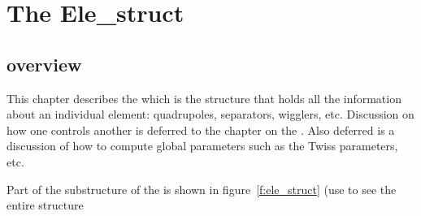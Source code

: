 \chapter{The Ele\_struct}
\section{overview}

This chapter describes the  which is the structure that
holds all the information about an individual element: quadrupoles,
separators, wigglers, etc. Discussion on how one  controls
another is deferred to the chapter on the . Also deferred
is a discussion of how to compute global parameters such as the 
Twiss parameters, etc.

Part of the substructure of the  is shown
in figure~\ref{f:ele_struct} (use  to see the entire structure 
